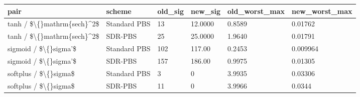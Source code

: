 \small
\setlength{\tabcolsep}{4pt}
\begin{tabular}{llllll}
\toprule
pair & scheme & old\_sig & new\_sig & old\_worst\_max & new\_worst\_max \\
\midrule
tanh / \$\textbackslash\{\}mathrm\{sech\}^2\$ & Standard PBS & 13 & 12.0000 & 0.8589 & 0.01762 \\
tanh / \$\textbackslash\{\}mathrm\{sech\}^2\$ & SDR-PBS & 25 & 25.0000 & 1.9640 & 0.01791 \\
sigmoid / \$\textbackslash\{\}sigma'\$ & Standard PBS & 102 & 117.00 & 0.2453 & 0.009964 \\
sigmoid / \$\textbackslash\{\}sigma'\$ & SDR-PBS & 157 & 186.00 & 0.9975 & 0.01305 \\
softplus / \$\textbackslash\{\}sigma\$ & Standard PBS & 3 & 0 & 3.9935 & 0.03306 \\
softplus / \$\textbackslash\{\}sigma\$ & SDR-PBS & 11 & 0 & 3.9966 & 0.0344 \\
\bottomrule
\end{tabular}
